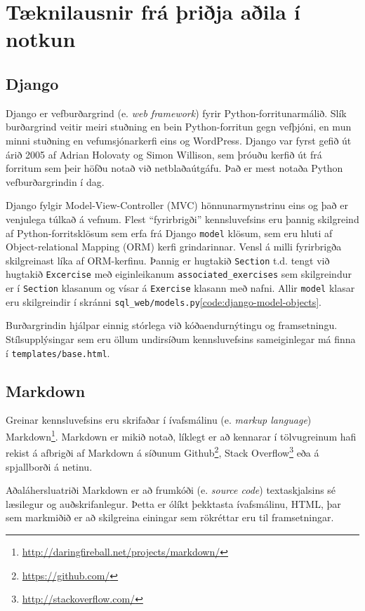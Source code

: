 \documentclass[a4paper,12pt,twoside,BCOR=10mm]{scrbook}
\begin{document}
\section{Tæknilausnir frá þriðja aðila í notkun}
\subsection{Django}
\label{sec:django}
Django er vefburðargrind (e. \emph{web framework}) fyrir Python-forritunarmálið. Slík burðargrind veitir meiri stuðning en bein Python-forritun gegn vefþjóni, en mun minni stuðning en vefumsjónarkerfi eins og WordPress. Django var fyrst gefið út árið 2005 af Adrian Holovaty og Simon Willison, sem þróuðu kerfið út frá forritum sem þeir höfðu notað við netblaðaútgáfu. Það er mest notaða Python vefburðargrindin í dag.

Django fylgir Model-View-Controller (MVC) hönnunarmynstrinu eins og það er venjulega túlkað á vefnum. Flest ``fyrirbrigði'' kennsluvefsins eru þannig skilgreind af Python-forritsklösum sem erfa frá Django \texttt{model} klösum, sem eru hluti af Object-relational Mapping (ORM) kerfi grindarinnar. Vensl á milli fyrirbrigða skilgreinast líka af ORM-kerfinu. Þannig er hugtakið \texttt{Section} t.d. tengt við hugtakið \texttt{Excercise} með eiginleikanum \texttt{associated_exercises} sem skilgreindur er í \texttt{Section} klasanum og vísar á \texttt{Exercise} klasann með nafni. Allir \texttt{model} klasar eru skilgreindir í skránni \texttt{sql\_web/models.py}\ref{code:django-model-objects}.

Burðargrindin hjálpar einnig stórlega við kóðaendurnýtingu og framsetningu. Stílsupplýsingar sem eru öllum undirsíðum kennsluvefsins sameiginlegar má finna í \texttt{templates/base.html}.
\subsection{Markdown}
\label{sec:markdown}
Greinar kennsluvefsins eru skrifaðar í ívafsmálinu (e. \emph{markup language}) Markdown\footnote{\url{http://daringfireball.net/projects/markdown/}}. Markdown er mikið notað, líklegt er að kennarar í tölvugreinum hafi rekist á afbrigði af Markdown á síðunum Github\footnote{\url{https://github.com/}}, Stack Overflow\footnote{\url{http://stackoverflow.com/}} eða á spjallborði á netinu.

Aðaláhersluatriði Markdown er að frumkóði (e. \emph{source code}) textaskjalsins sé læsilegur og auðskrifanlegur. Þetta er ólíkt þekktasta ívafsmálinu, HTML, þar sem markmiðið er að skilgreina einingar sem rökréttar eru til framsetningar. 
\end{document}
